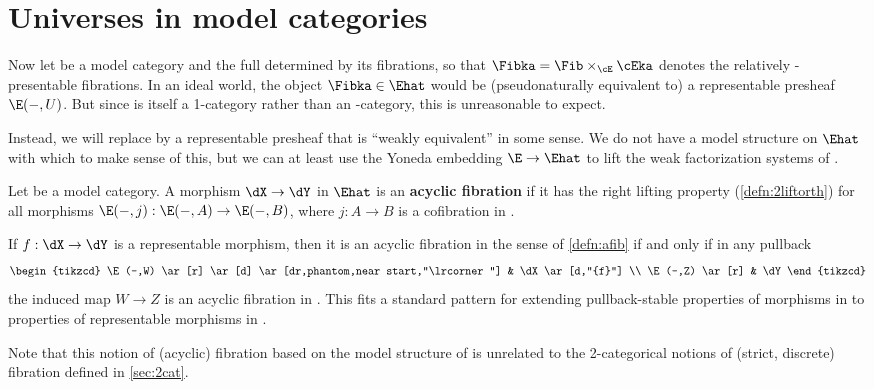 \section{Universes in model categories}
\label{sec:univalence}

Now let \E be a model category and \Fib the full \nfs determined by its fibrations, so that $\Fibka = \Fib\times_\cE \cEka$ denotes the relatively \ka-presentable fibrations.
In an ideal world, the object $\Fibka\in\Ehat$ would be (pseudonaturally equivalent to) a representable presheaf $\E(-,U)$.
But since \E is itself a 1-category rather than an \io-category, this is unreasonable to expect. %

Instead, we will replace \Fibka by a representable presheaf that is ``weakly equivalent'' in some sense.
We do not have a model structure on $\Ehat$ with which to make sense of this, but we can at least use the Yoneda embedding $\E\to\Ehat$ to lift the weak factorization systems of \E.

\begin{defn}\label{defn:afib}
  Let \E be a model category.
  A morphism $\dX\to\dY$ in $\Ehat$ is an \textbf{acyclic fibration} if it has the right lifting property (\cref{defn:2liftorth}) for all morphisms $\E(-,j) : \E(-,A) \to \E(-,B)$, where $j:A\to B$ is a cofibration in \E.
\end{defn}

\begin{rmk}
  If $f:\dX\to\dY$ is a representable morphism, then it is an acyclic fibration in the sense of \cref{defn:afib} if and only if in any pullback
  \begin{equation*}
    \begin{tikzcd}
      \E(-,W) \ar[r] \ar[d] \ar[dr,phantom,near start,"\lrcorner"] & \dX\ar[d,"{f}"] \\
      \E(-,Z) \ar[r] & \dY
    \end{tikzcd}
  \end{equation*}
  the induced map $W\to Z$ is an acyclic fibration in \E.
  This fits a standard pattern for extending pullback-stable properties of morphisms in \E to properties of representable morphisms in \Ehat.
  
  Note that this notion of (acyclic) fibration based on the model structure of \E is unrelated to the 2-categorical notions of (strict, discrete) fibration defined in \cref{sec:2cat}.
\end{rmk}

